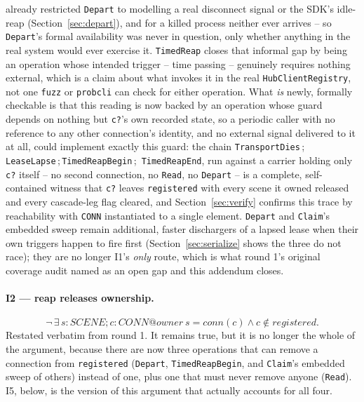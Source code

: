 \documentclass[a4paper,10pt,fleqn]{article}
\begin{document}
already restricted \texttt{Depart} to modelling a real disconnect signal
or the SDK's idle-reap (Section~\ref{sec:depart}), and for a killed
process neither ever arrives -- so \texttt{Depart}'s formal availability
was never in question, only whether anything in the real system would
ever exercise it. \texttt{TimedReap} closes that informal gap by being an
operation whose intended trigger -- time passing -- genuinely requires
nothing external, which is a claim about what invokes it in the real
\texttt{HubClientRegistry}, not one \texttt{fuzz} or \texttt{probcli}
can check for either operation. What \emph{is} newly, formally checkable
is that this reading is now backed by an operation whose guard depends
on nothing but \texttt{c?}'s own recorded state, so a periodic caller
with no reference to any other connection's identity, and no external
signal delivered to it at all, could implement exactly this guard: the
chain
\texttt{TransportDies}\,;\,\texttt{LeaseLapse}\,;\,\texttt{TimedReapBegin}\,;
\,\texttt{TimedReapEnd},
run against a carrier holding only \texttt{c?} itself -- no second
connection, no \texttt{Read}, no \texttt{Depart} -- is a complete,
self-contained witness that \texttt{c?} leaves \texttt{registered} with
every scene it owned released and every cascade-leg flag cleared, and
Section~\ref{sec:verify} confirms this
trace by reachability with \texttt{CONN} instantiated to a single element.
\texttt{Depart} and \texttt{Claim}'s embedded sweep remain additional,
faster dischargers of a lapsed lease when their own triggers happen to
fire first (Section~\ref{sec:serialize} shows the three do not race); they
are no longer I1's \emph{only} route, which is what round 1's original
coverage audit named as an open gap and this addendum closes.

\paragraph{I2 --- reap releases ownership.}
\[
  \lnot\, \exists\, s : SCENE; c : CONN @
    owner~s = conn(c) \land c \notin registered.
\]
Restated verbatim from round 1. It remains true, but it is no longer the
whole of the argument, because there are now three operations that can
remove a connection from \texttt{registered}
(\texttt{Depart}, \texttt{TimedReapBegin}, and \texttt{Claim}'s embedded
sweep of others) instead of one, plus one that must never remove anyone
(\texttt{Read}). I5, below, is the version of this argument that
actually accounts for all four.
\end{document}
